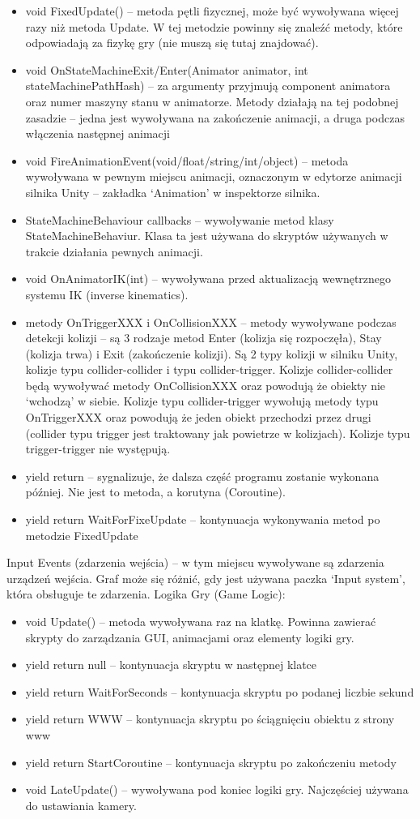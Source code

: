 \documentclass[12pt,twoside]{article}
\begin{document}
\begin{itemize}
\item void FixedUpdate() -- metoda pętli fizycznej, może być wywoływana więcej
razy niż metoda Update. W tej metodzie powinny się znaleźć metody, które
odpowiadają za fizykę gry (nie muszą się tutaj znajdować).
\item void OnStateMachineExit/Enter(Animator animator, int stateMachinePathHash)
– za argumenty przyjmują component animatora oraz numer maszyny stanu w
animatorze. Metody działają na tej podobnej zasadzie -- jedna jest wywoływana na
zakończenie animacji, a druga podczas włączenia następnej animacji
\item void FireAnimationEvent(void/float/string/int/object) -- metoda wywoływana
w pewnym miejscu animacji, oznaczonym w edytorze animacji silnika Unity –
zakładka `Animation' w inspektorze silnika. 
\item StateMachineBehaviour callbacks -- wywoływanie metod klasy
StateMachineBehaviur. Klasa ta jest używana do skryptów używanych w trakcie
działania pewnych animacji. 
\item void OnAnimatorIK(int) -- wywoływana przed aktualizacją wewnętrznego
systemu IK (inverse kinematics).
\item metody OnTriggerXXX i  OnCollisionXXX -- metody wywoływane podczas detekcji
kolizji -- są 3 rodzaje metod Enter (kolizja się rozpoczęła), Stay (kolizja trwa)
i Exit (zakończenie kolizji). Są 2 typy kolizji w silniku Unity, kolizje typu
collider-collider i typu collider-trigger. Kolizje collider-collider będą
wywoływać metody OnCollisionXXX oraz powodują że obiekty nie  `wchodzą' w
siebie. Kolizje typu collider-trigger wywołują metody typu OnTriggerXXX oraz
powodują że jeden obiekt przechodzi przez drugi (collider typu trigger jest
traktowany jak powietrze w kolizjach). Kolizje typu trigger-trigger nie
występują.
\item yield return -- sygnalizuje, że dalsza część programu zostanie wykonana
później. Nie jest to metoda, a korutyna (Coroutine). 
\item yield return WaitForFixeUpdate -- kontynuacja wykonywania metod po metodzie
FixedUpdate
\end{itemize}
Input Events (zdarzenia wejścia) -- w tym miejscu wywoływane są zdarzenia
urządzeń wejścia. Graf może się różnić, gdy jest używana paczka `Input system',
która obsługuje te zdarzenia. Logika Gry (Game Logic):
\begin{itemize}
\item void Update() -- metoda wywoływana raz na klatkę. Powinna zawierać skrypty do zarządzania GUI, animacjami oraz elementy logiki gry.
\item yield return null -- kontynuacja skryptu w następnej klatce
\item yield return WaitForSeconds -- kontynuacja skryptu po  podanej liczbie sekund
\item yield return WWW -- kontynuacja skryptu po ściągnięciu obiektu z strony www
\item yield return StartCoroutine -- kontynuacja skryptu po zakończeniu metody
\item void LateUpdate() -- wywoływana pod koniec logiki gry. Najczęściej używana do ustawiania kamery.
\end{itemize}
\end{document}
